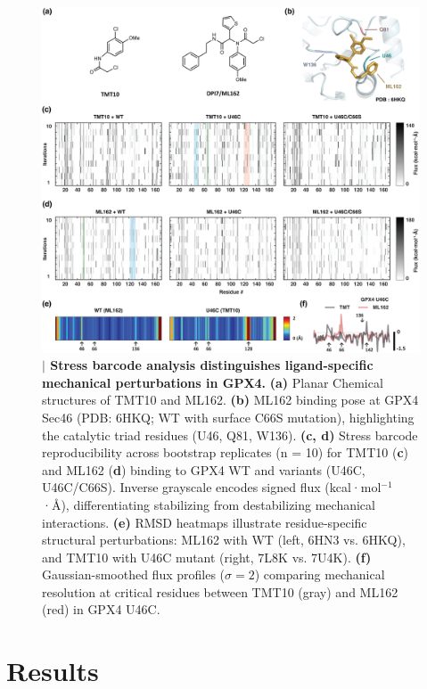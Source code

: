 \documentclass[pdflatex,sn-mathphys-num]{sn-jnl}
\begin{document}
\begin{figure}[h!]
  \centering
  \includegraphics[width=\textwidth]{Figure 2.png}
  \caption{\textbf{$\vert$ Stress barcode analysis distinguishes ligand-specific mechanical perturbations in GPX4.}
           \textbf{(a)} Planar Chemical structures of TMT10 and ML162.
           \textbf{(b)} ML162 binding pose at GPX4 Sec46 (PDB: 6HKQ; WT with surface C66S mutation), highlighting the catalytic triad residues (U46, Q81, W136).
           \textbf{(c, d)} Stress barcode reproducibility across bootstrap replicates (n = 10) for TMT10 (\textbf{c}) and ML162 (\textbf{d}) binding to GPX4 WT and variants (U46C, U46C/C66S). Inverse grayscale encodes signed flux (kcal·mol$^{-1}$·Å), differentiating stabilizing from destabilizing mechanical interactions.
           \textbf{(e)} RMSD heatmaps illustrate residue-specific structural perturbations: ML162 with WT (left, 6HN3 vs. 6HKQ), and TMT10 with U46C mutant (right, 7L8K vs. 7U4K).
           \textbf{(f)} Gaussian-smoothed flux profiles ($\sigma = 2$) comparing mechanical resolution at critical residues between TMT10 (gray) and ML162 (red) in GPX4 U46C.}
  \label{fig:stress-barcodes}
\end{figure}

\section*{Results}
\end{document}
